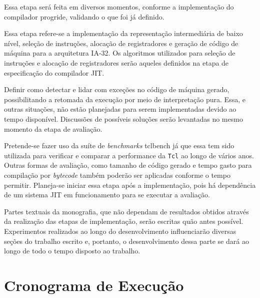Essa etapa será feita em diversos momentos, conforme a implementação
do compilador progride, validando o que foi já definido.


Essa etapa refere-se a implementação da representação intermediária de
baixo nível, seleção de instruções, alocação de registradores e
geração de código de máquina para a arquitetura IA-32. Os algoritmos
utilizados para seleção de instruções e alocação de registradores
serão aqueles definidos na etapa de especificação do compilador JIT.



Definir como detectar e lidar com exceções no código de máquina gerado,
possibilitando a retomada da execução por meio de interpretação pura.
Essa, e outras situações, não estão planejadas para serem
implementadas devido ao tempo disponível. Discussões de possíveis
soluções serão levantadas no mesmo momento da etapa de avaliação.


Pretende-se fazer uso da suíte de \textit{benchmarks}
tclbench \cite{tcllib_bench} já que essa tem sido utilizada para verificar
e comparar a performance da \texttt{Tcl} ao longo de vários
anos. Outras formas de avaliação, como tamanho de código gerado e
tempo gasto para compilação por \textit{bytecode} também
poderão ser aplicadas conforme o tempo permitir. Planeja-se iniciar
essa etapa após a implementação, pois há dependência de um sistema JIT
em funcionamento para se executar a avaliação.


Partes textuais da monografia, que não dependam de resultados obtidos
através da realização das etapas de implementação, serão escritas quão
antes possível. Experimentos realizados ao longo do desenvolvimento
influenciarão diversas seções do trabalho escrito e, portanto, o
desenvolvimento dessa parte se dará ao longo de todo o tempo disposto
ao trabalho.


\section{Cronograma de Execução}

